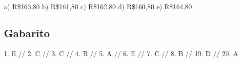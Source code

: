 \documentclass[12pt,a4paper]{article}
\begin{document}
a) R\$163,80
b) R\$161,80
c) R\$162,80
d) R\$160,80
e) R\$164,80 

\subsection*{Gabarito}

1. E // 2. C // 3. C // 4. B // 5. A // 6. E // 7. C // 8. B // 19. D // 20.  A
\end{document}
